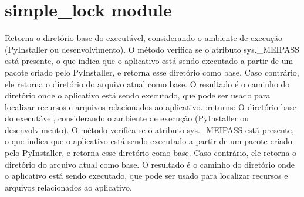 \documentclass[letterpaper,10pt,english]{sphinxmanual}
\begin{document}
\sphinxstepscope


\section{simple\_lock module}
\label{\detokenize{api/simple_lock:module-simple_lock}}\label{\detokenize{api/simple_lock:simple-lock-module}}\label{\detokenize{api/simple_lock::doc}}

\begin{fulllineitems}
\label{\detokenize{api/simple_lock:simple_lock.exe_dir_base}}
\pysigstartsignatures
\pysiglinewithargsret
{}
{}
{}
\pysigstopsignatures
\sphinxAtStartPar
Retorna o diretório base do executável, considerando o ambiente de execução (PyInstaller ou desenvolvimento). O método verifica se o atributo sys.\_MEIPASS está presente, o que indica que o aplicativo está sendo executado a partir de um pacote criado pelo PyInstaller, e retorna esse diretório como base. Caso contrário, ele retorna o diretório do arquivo atual como base. O resultado é o caminho do diretório onde o aplicativo está sendo executado, que pode ser usado para localizar recursos e arquivos relacionados ao aplicativo.
:returns: O diretório base do executável, considerando o ambiente de execução (PyInstaller ou desenvolvimento). O método verifica se o atributo sys.\_MEIPASS está presente, o que indica que o aplicativo está sendo executado a partir de um pacote criado pelo PyInstaller, e retorna esse diretório como base. Caso contrário, ele retorna o diretório do arquivo atual como base. O resultado é o caminho do diretório onde o aplicativo está sendo executado, que pode ser usado para localizar recursos e arquivos relacionados ao aplicativo.
\begin{quote}\begin{description}
\sphinxAtStartPar
{}

\end{description}\end{quote}

\end{fulllineitems}

\end{document}
